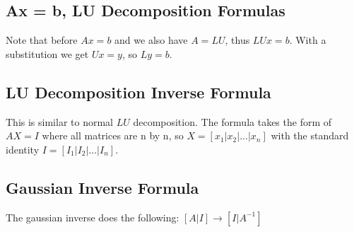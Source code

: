 
\subsection*{Ax = b, LU Decomposition Formulas}
Note that before $Ax = b$ and we also have $A = LU$, thus $LUx = b$. With a
substitution we get $Ux = y$, so $Ly = b$.

\subsection*{LU Decomposition Inverse Formula}
This is similar to normal $LU$ decomposition. The formula takes the form of
$AX = I$ where all matrices are n by n, so $X = [ x_1 | x_2 | ... | x_n ]$ with
the standard identity $I = [I_1 | I_2 | ... | I_n] $.

\subsection*{Gaussian Inverse Formula}
The gaussian inverse does the following: $[A | I] \rightarrow [I | A^{-1}]$

